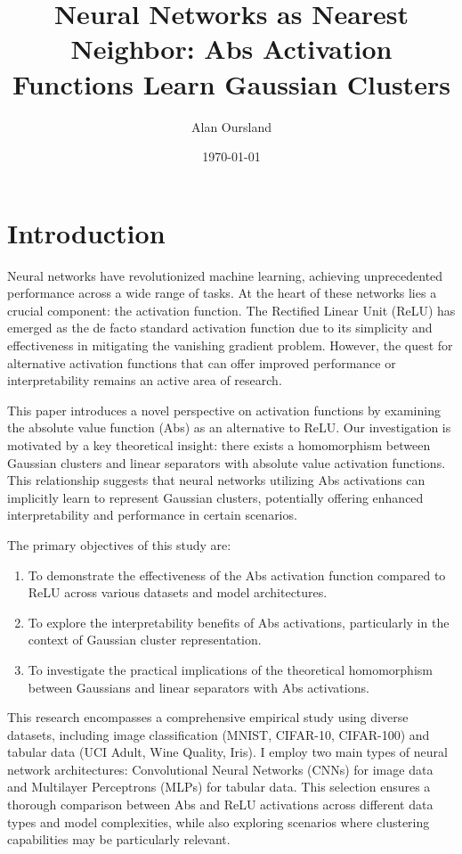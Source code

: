 \documentclass[11pt]{article}
\title{Neural Networks as Nearest Neighbor: Abs Activation Functions Learn Gaussian Clusters}
\author{Alan Oursland}
\date{\today}
\begin{document}
\maketitle

\begin{abstract}
\end{abstract}

\section{Introduction}
Neural networks have revolutionized machine learning, achieving unprecedented performance across a 
wide range of tasks. At the heart of these networks lies a crucial component: the activation 
function. The Rectified Linear Unit (ReLU) has emerged as the de facto standard activation 
function due to its simplicity and effectiveness in mitigating the vanishing gradient problem. 
However, the quest for alternative activation functions that can offer improved performance or 
interpretability remains an active area of research.

This paper introduces a novel perspective on activation functions by examining the absolute value 
function (Abs) as an alternative to ReLU. Our investigation is motivated by a key theoretical 
insight: there exists a homomorphism between Gaussian clusters and linear separators with absolute 
value activation functions. This relationship suggests that neural networks utilizing Abs 
activations can implicitly learn to represent Gaussian clusters, potentially offering enhanced 
interpretability and performance in certain scenarios.

The primary objectives of this study are:
\begin{enumerate}
\item To demonstrate the effectiveness of the Abs activation function compared to ReLU across 
various datasets and model architectures.
\item To explore the interpretability benefits of Abs activations, particularly in the context of 
Gaussian cluster representation.
\item To investigate the practical implications of the theoretical homomorphism between Gaussians 
and linear separators with Abs activations.
\end{enumerate}

This research encompasses a comprehensive empirical study using diverse datasets, including image 
classification (MNIST, CIFAR-10, CIFAR-100) and tabular data (UCI Adult, Wine Quality, Iris). I 
employ two main types of neural network architectures: Convolutional Neural Networks (CNNs) for 
image data and Multilayer Perceptrons (MLPs) for tabular data. This selection ensures a thorough 
comparison between Abs and ReLU activations across different data types and model complexities, 
while also exploring scenarios where clustering capabilities may be particularly relevant.
\end{document}
